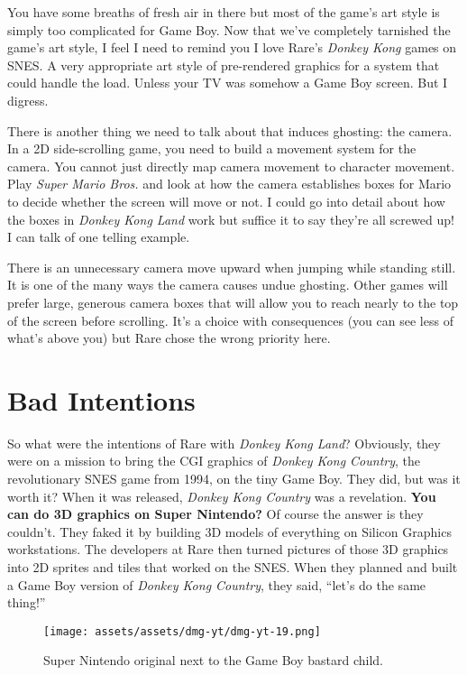 \documentclass{book}
\begin{document}
You have some breaths of fresh air in there but most of the game’s art style is simply too complicated for Game Boy. Now that we’ve completely tarnished the game’s art style, I feel I need to remind you I love Rare’s \emph{Donkey Kong} games on SNES. A very appropriate art style of pre-rendered graphics for a system that could handle the load. Unless your TV was somehow a Game Boy screen. But I digress.

There is another thing we need to talk about that induces ghosting: the camera. In a 2D side-scrolling game, you need to build a movement system for the camera. You cannot just directly map camera movement to character movement. Play \emph{Super Mario Bros.} and look at how the camera establishes boxes for Mario to decide whether the screen will move or not. I could go into detail about how the boxes in \emph{Donkey Kong Land} work but suffice it to say they’re all screwed up! I can talk of one telling example.



There is an unnecessary camera move upward when jumping while standing still. It is one of the many ways the camera causes undue ghosting. Other games will prefer large, generous camera boxes that will allow you to reach nearly to the top of the screen before scrolling. It’s a choice with consequences (you can see less of what’s above you) but Rare chose the wrong priority here.

\FloatBarrier\needspace{10mm}\section*{Bad Intentions}\nopagebreak[4]

So what were the intentions of Rare with \emph{Donkey Kong Land}? Obviously, they were on a mission to bring the CGI graphics of \emph{Donkey Kong Country}, the revolutionary SNES game from 1994, on the tiny Game Boy. They did, but was it worth it? When it was released, \emph{Donkey Kong Country} was a revelation. \textbf{You can do 3D graphics on Super Nintendo?} Of course the answer is they couldn’t. They faked it by building 3D models of everything on Silicon Graphics workstations. The developers at Rare then turned pictures of those 3D graphics into 2D sprites and tiles that worked on the SNES. When they planned and built a Game Boy version of \emph{Donkey Kong Country}, they said, “let’s do the same thing!”

\begin{figure}[hbt]
\vskip 10pt
\centering \texttt{[image: assets/assets/dmg-yt/dmg-yt-19.png]}\par\pagetwodescription Super Nintendo original next to the Game Boy bastard child.
\vskip 6pt
\end{figure}
\end{document}
